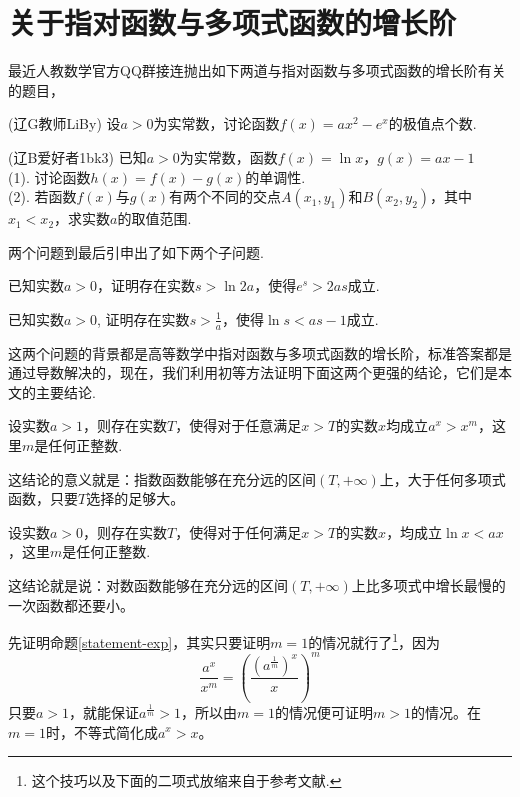 
\section{关于指对函数与多项式函数的增长阶}
\label{sec:exp-log-level}

最近人教数学官方QQ群接连抛出如下两道与指对函数与多项式函数的增长阶有关的题目，
\begin{exercise}
  (辽G教师LiBy) 设$a>0$为实常数，讨论函数$f(x)=ax^2-e^x$的极值点个数.
\end{exercise}

\begin{exercise}
  (辽B爱好者1bk3) 已知$a>0$为实常数，函数$f(x)=\ln{x}$，$g(x)=ax-1$ \\
  (1). 讨论函数$h(x)=f(x)-g(x)$的单调性. \\
  (2). 若函数$f(x)$与$g(x)$有两个不同的交点$A(x_1,y_1)$和$B(x_2,y_2)$，其中$x_1<x_2$，求实数$a$的取值范围.
\end{exercise}
两个问题到最后引申出了如下两个子问题.
\begin{topic}
  \label{topic-exp}
  已知实数$a>0$，证明存在实数$s>\ln{2a}$，使得$e^s>2as$成立.
\end{topic}

\begin{topic}
  \label{topic-log}
  已知实数$a>0$, 证明存在实数$s>\frac{1}{a}$，使得$\ln{s}<as-1$成立.
\end{topic}

这两个问题的背景都是高等数学中指对函数与多项式函数的增长阶，标准答案都是通过导数解决的，现在，我们利用初等方法证明下面这两个更强的结论，它们是本文的主要结论.
\begin{statement}
  \label{statement-exp}
  设实数$a>1$，则存在实数$T$，使得对于任意满足$x>T$的实数$x$均成立$a^x>x^m$，这里$m$是任何正整数.
\end{statement}
这结论的意义就是：指数函数能够在充分远的区间$(T,+\infty)$上，大于任何多项式函数，只要$T$选择的足够大。

\begin{statement}
  \label{statement-log}
  设实数$a>0$，则存在实数$T$，使得对于任何满足$x>T$的实数$x$，均成立$\ln{x}<ax$，这里$m$是任何正整数.
\end{statement}
这结论就是说：对数函数能够在充分远的区间$(T,+\infty)$上比多项式中增长最慢的一次函数都还要小。

先证明命题\ref{statement-exp}，其实只要证明$m=1$的情况就行了\footnote{这个技巧以及下面的二项式放缩来自于参考文献\cite{caculus-course}.}，因为
\[ \frac{a^x}{x^m} = \left( \frac{(a^{\frac{1}{m}})^x}{x} \right)^m \]
只要$a>1$，就能保证$a^{\frac{1}{m}}>1$，所以由$m=1$的情况便可证明$m>1$的情况。在$m=1$时，不等式简化成$a^x>x$。

